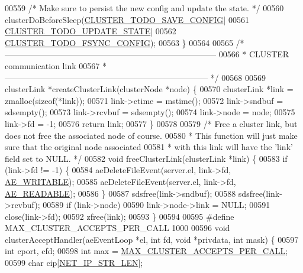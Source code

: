 \begin{DoxyCode}
{{{{{{{{{00559     \textcolor{comment}{/* Make sure to persist the new config and update the state. */}
00560     clusterDoBeforeSleep(\hyperlink{cluster_8h_a0ae5ff08fbae3c655012b4de8bfc327d}{CLUSTER\_TODO\_SAVE\_CONFIG}|
00561                          \hyperlink{cluster_8h_abea0d393cba342261e4a7e6fb745f388}{CLUSTER\_TODO\_UPDATE\_STATE}|
00562                          \hyperlink{cluster_8h_accc9a00230cd04789db2398bb3ab715a}{CLUSTER\_TODO\_FSYNC\_CONFIG});
00563 \}
00564 
00565 \textcolor{comment}{/* -----------------------------------------------------------------------------}
00566 \textcolor{comment}{ * CLUSTER communication link}
00567 \textcolor{comment}{ * -------------------------------------------------------------------------- */}
00568 
00569 clusterLink *createClusterLink(clusterNode *node) \{
00570     clusterLink *link = zmalloc(\textcolor{keyword}{sizeof}(*link));
00571     link->ctime = mstime();
00572     link->sndbuf = sdsempty();
00573     link->rcvbuf = sdsempty();
00574     link->node = node;
00575     link->fd = -1;
00576     \textcolor{keywordflow}{return} link;
00577 \}
00578 
00579 \textcolor{comment}{/* Free a cluster link, but does not free the associated node of course.}
00580 \textcolor{comment}{ * This function will just make sure that the original node associated}
00581 \textcolor{comment}{ * with this link will have the 'link' field set to NULL. */}
00582 \textcolor{keywordtype}{void} freeClusterLink(clusterLink *link) \{
00583     \textcolor{keywordflow}{if} (link->fd != -1) \{
00584         aeDeleteFileEvent(server.el, link->fd, \hyperlink{ae_8h_ab6bfb0366ccb6277112d132c2a2bf500}{AE\_WRITABLE});
00585         aeDeleteFileEvent(server.el, link->fd, \hyperlink{ae_8h_a7a9a2162d007d09739955b4e55c65bf3}{AE\_READABLE});
00586     \}
00587     sdsfree(link->sndbuf);
00588     sdsfree(link->rcvbuf);
00589     \textcolor{keywordflow}{if} (link->node)
00590         link->node->link = NULL;
00591     close(link->fd);
00592     zfree(link);
00593 \}
00594 
00595 \textcolor{preprocessor}{#}\textcolor{preprocessor}{define} \textcolor{preprocessor}{MAX\_CLUSTER\_ACCEPTS\_PER\_CALL} 1000
00596 \textcolor{keywordtype}{void} clusterAcceptHandler(aeEventLoop *el, \textcolor{keywordtype}{int} fd, \textcolor{keywordtype}{void} *privdata, \textcolor{keywordtype}{int} mask) \{
00597     \textcolor{keywordtype}{int} cport, cfd;
00598     \textcolor{keywordtype}{int} max = \hyperlink{cluster_8c_aa33746b19367347d43a13080ca87b871}{MAX\_CLUSTER\_ACCEPTS\_PER\_CALL};
00599     \textcolor{keywordtype}{char} cip[\hyperlink{server_8h_ad97c5405ed22a94e9fcc10fba577d6c0}{NET\_IP\_STR\_LEN}];
}}}}}}}}}
\end{DoxyCode}
